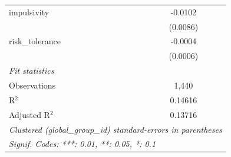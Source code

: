 \begin{tabular}{lc}
   impulsivity         & -0.0102\\   
                       & (0.0086)\\   
   risk\_tolerance     & -0.0004\\   
                       & (0.0006)\\   
   \midrule
   \emph{Fit statistics}\\
   Observations        & 1,440\\  
   R$^2$               & 0.14616\\  
   Adjusted R$^2$      & 0.13716\\  
   \midrule \midrule
   \multicolumn{2}{l}{\emph{Clustered (global\_group\_id) standard-errors in parentheses}}\\
   \multicolumn{2}{l}{\emph{Signif. Codes: ***: 0.01, **: 0.05, *: 0.1}}\\
\end{tabular}
\par\endgroup


